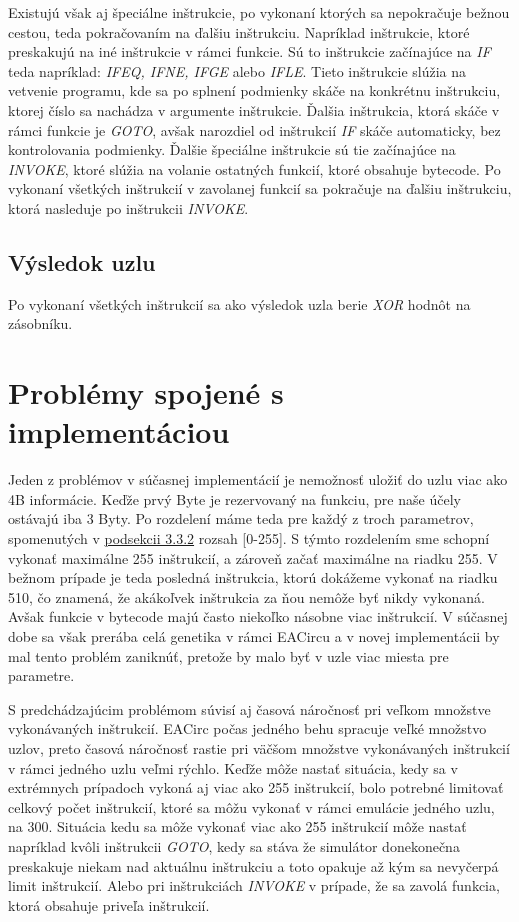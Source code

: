 Existujú však aj špeciálne inštrukcie, po vykonaní ktorých sa nepokračuje bežnou cestou, teda pokračovaním na ďalšiu inštrukciu. Napríklad inštrukcie, ktoré preskakujú na iné inštrukcie v rámci funkcie. Sú to inštrukcie začínajúce na \textit{IF} teda napríklad: \textit{IFEQ, IFNE, IFGE} alebo \textit{IFLE}. Tieto inštrukcie slúžia na vetvenie programu, kde sa po splnení podmienky skáče na konkrétnu inštrukciu, ktorej číslo sa nachádza v argumente inštrukcie. Ďalšia inštrukcia, ktorá skáče v rámci funkcie je \textit{GOTO}, avšak narozdiel od inštrukcií \textit{IF} skáče automaticky, bez kontrolovania podmienky. Ďalšie špeciálne inštrukcie sú tie začínajúce na \textit{INVOKE}, ktoré slúžia na volanie ostatných funkcií, ktoré obsahuje bytecode. Po vykonaní všetkých inštrukcií v zavolanej funkcií sa pokračuje na ďalšiu inštrukciu, ktorá nasleduje po inštrukcii \textit{INVOKE}. 

\subsection{Výsledok uzlu}

Po vykonaní všetkých inštrukcií sa ako výsledok uzla berie \textit{XOR} hodnôt na zásobníku. 

\section{Problémy spojené s implementáciou}
\label{sec:problems}

Jeden z problémov v súčasnej implementácií je nemožnosť uložiť do uzlu viac ako 4B informácie. Keďže prvý Byte je rezervovaný na funkciu, pre naše účely ostávajú iba 3 Byty. Po rozdelení máme teda pre každý z troch parametrov, spomenutých v \hyperref[subsec:jvm-nodes]{podsekcii 3.3.2} rozsah [0-255]. S týmto rozdelením sme schopní vykonať maximálne 255 inštrukcií, a zároveň začať maximálne na riadku 255. V bežnom prípade je teda posledná inštrukcia, ktorú dokážeme vykonať na riadku 510, čo znamená, že akákoľvek inštrukcia za ňou nemôže byť nikdy vykonaná. Avšak funkcie v bytecode majú často niekoľko násobne viac inštrukcií. V súčasnej dobe sa však prerába celá genetika v rámci EACircu a v novej implementácii by mal tento problém zaniknúť, pretože by malo byť v uzle viac miesta pre parametre.

S predchádzajúcim problémom súvisí aj časová náročnosť pri veľkom množstve vykonávaných inštrukcií. EACirc počas jedného behu spracuje veľké množstvo uzlov, preto časová náročnosť rastie pri väčšom množstve vykonávaných inštrukcií v rámci jedného uzlu veľmi rýchlo. Keďže môže nastať situácia, kedy sa v extrémnych prípadoch vykoná aj viac ako 255 inštrukcií, bolo potrebné limitovať celkový počet inštrukcií, ktoré sa môžu vykonať v rámci emulácie jedného uzlu, na 300. Situácia kedu sa môže vykonať viac ako 255 inštrukcií môže nastať napríklad kvôli inštrukcii \textit{GOTO}, kedy sa stáva že simulátor donekonečna preskakuje niekam nad aktuálnu inštrukciu a toto opakuje až kým sa nevyčerpá limit inštrukcií. Alebo pri inštrukciách \textit{INVOKE} v prípade, že sa zavolá funkcia, ktorá obsahuje priveľa inštrukcií.

